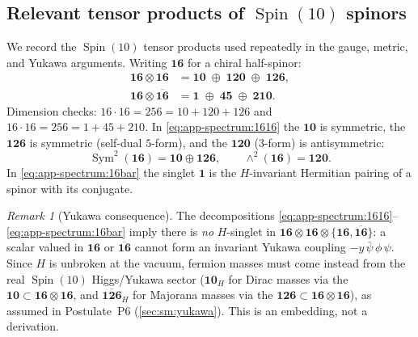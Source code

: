 \documentclass[11pt]{article}
\theoremstyle{plain}
\theoremstyle{definition}
\theoremstyle{remark}
\newtheorem{remark}[theorem]{Remark}
\newcommand{\Spin}{\operatorname{Spin}}
\newcommand{\Sym}{\operatorname{Sym}}
\begin{document}
\subsection{Relevant tensor products of $\Spin(10)$ spinors}
\label{sec:app-spectrum:tensor}

We record the $\Spin(10)$ tensor products used repeatedly in the gauge,
metric, and Yukawa arguments. Writing $\mathbf{16}$ for a chiral
half-spinor:
\begin{align}
  \mathbf{16}\otimes\mathbf{16}
    &= \mathbf{10}\;\oplus\;\mathbf{120}\;\oplus\;\mathbf{126},
    \label{eq:app-spectrum:1616}\\
  \mathbf{16}\otimes\overline{\mathbf{16}}
    &= \mathbf{1}\;\oplus\;\mathbf{45}\;\oplus\;\mathbf{210}.
    \label{eq:app-spectrum:16bar}
\end{align}
Dimension checks: $16\cdot16=256=10+120+126$ and
$16\cdot16=256=1+45+210$. In \eqref{eq:app-spectrum:1616} the
$\mathbf{10}$ is symmetric, the $\mathbf{126}$ is symmetric (self-dual
$5$-form), and the $\mathbf{120}$ ($3$-form) is antisymmetric:
\begin{equation}
  \Sym^2(\mathbf{16}) = \mathbf{10}\oplus\mathbf{126},
  \qquad
  \wedge^2(\mathbf{16}) = \mathbf{120}.
  \label{eq:app-spectrum:symanti}
\end{equation}
In \eqref{eq:app-spectrum:16bar} the singlet $\mathbf 1$ is the
$H$-invariant Hermitian pairing of a spinor with its conjugate.

\begin{remark}[Yukawa consequence]\label{rem:app-spectrum:yukawa}
The decompositions \eqref{eq:app-spectrum:1616}--\eqref{eq:app-spectrum:16bar}
imply there is \emph{no} $H$-singlet in
$\mathbf{16}\otimes\mathbf{16}\otimes\{\mathbf{16},\overline{\mathbf{16}}\}$:
a scalar valued in $\mathbf{16}$ or $\overline{\mathbf{16}}$ cannot form
an invariant Yukawa coupling $-y\,\bar\psi\,\phi\,\psi$. Since $H$ is
unbroken at the vacuum, fermion masses must come instead from the real
$\Spin(10)$ Higgs/Yukawa sector ($\mathbf{10}_H$ for Dirac masses via the
$\mathbf{10}\subset\mathbf{16}\otimes\mathbf{16}$, and
$\overline{\mathbf{126}}_H$ for Majorana masses via the
$\mathbf{126}\subset\mathbf{16}\otimes\mathbf{16}$), as assumed in
Postulate~P6 (\autoref{sec:sm:yukawa}). This is an embedding, not a
derivation.
\end{remark}
\end{document}
